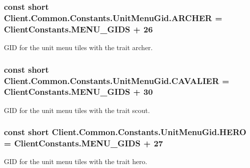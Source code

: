 \subsubsection[{A\+R\+C\+H\+E\+R}]{\setlength{\rightskip}{0pt plus 5cm}const short Client.\+Common.\+Constants.\+Unit\+Menu\+Gid.\+A\+R\+C\+H\+E\+R = {\bf Client\+Constants.\+M\+E\+N\+U\+\_\+\+G\+I\+D\+S} + 26}\label{classClient_1_1Common_1_1Constants_1_1UnitMenuGid_a818316b1993049515539c636aac7ad44}


G\+I\+D for the unit menu tiles with the trait archer. 

\hypertarget{classClient_1_1Common_1_1Constants_1_1UnitMenuGid_a93d49144a5f9b5cb8ac8c9e9e44c70de}{}
\subsubsection[{C\+A\+V\+A\+L\+I\+E\+R}]{\setlength{\rightskip}{0pt plus 5cm}const short Client.\+Common.\+Constants.\+Unit\+Menu\+Gid.\+C\+A\+V\+A\+L\+I\+E\+R = {\bf Client\+Constants.\+M\+E\+N\+U\+\_\+\+G\+I\+D\+S} + 30}\label{classClient_1_1Common_1_1Constants_1_1UnitMenuGid_a93d49144a5f9b5cb8ac8c9e9e44c70de}


G\+I\+D for the unit menu tiles with the trait scout. 

\hypertarget{classClient_1_1Common_1_1Constants_1_1UnitMenuGid_a51edae59075cf42a87ff680c79d1d5cb}{}
\subsubsection[{H\+E\+R\+O}]{\setlength{\rightskip}{0pt plus 5cm}const short Client.\+Common.\+Constants.\+Unit\+Menu\+Gid.\+H\+E\+R\+O = {\bf Client\+Constants.\+M\+E\+N\+U\+\_\+\+G\+I\+D\+S} + 27}\label{classClient_1_1Common_1_1Constants_1_1UnitMenuGid_a51edae59075cf42a87ff680c79d1d5cb}


G\+I\+D for the unit menu tiles with the trait hero. 

